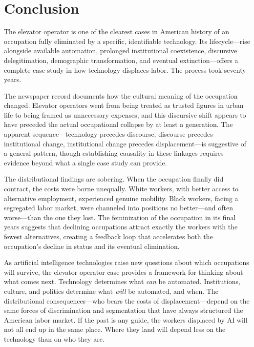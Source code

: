 \documentclass[12pt]{article}
\begin{document}
\section{Conclusion} \label{sec:conclusion}

The elevator operator is one of the clearest cases in American history of an occupation fully eliminated by a specific, identifiable technology. Its lifecycle---rise alongside available automation, prolonged institutional coexistence, discursive delegitimation, demographic transformation, and eventual extinction---offers a complete case study in how technology displaces labor. The process took seventy years.

The newspaper record documents how the cultural meaning of the occupation changed. Elevator operators went from being treated as trusted figures in urban life to being framed as unnecessary expenses, and this discursive shift appears to have preceded the actual occupational collapse by at least a generation. The apparent sequence---technology precedes discourse, discourse precedes institutional change, institutional change precedes displacement---is suggestive of a general pattern, though establishing causality in these linkages requires evidence beyond what a single case study can provide.

The distributional findings are sobering. When the occupation finally did contract, the costs were borne unequally. White workers, with better access to alternative employment, experienced genuine mobility. Black workers, facing a segregated labor market, were channeled into positions no better---and often worse---than the one they lost. The feminization of the occupation in its final years suggests that declining occupations attract exactly the workers with the fewest alternatives, creating a feedback loop that accelerates both the occupation's decline in status and its eventual elimination.

As artificial intelligence technologies raise new questions about which occupations will survive, the elevator operator case provides a framework for thinking about what comes next. Technology determines what \emph{can} be automated. Institutions, culture, and politics determine what \emph{will} be automated, and when. The distributional consequences---who bears the costs of displacement---depend on the same forces of discrimination and segmentation that have always structured the American labor market. If the past is any guide, the workers displaced by AI will not all end up in the same place. Where they land will depend less on the technology than on who they are.
\end{document}

